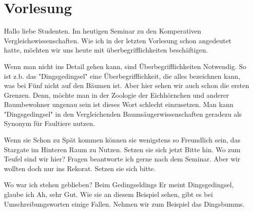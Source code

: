 
\newpage
\section{Vorlesung}
\label{sec:vorlesung}
    \charaktere{\Sum, \Gimli, \Prof, \Studa, \Studb, \Studc}

\begin{verseplay}[3em]
\s{\Prof} Hallo liebe Studenten. Im heutigen Seminar zu den Komperativen Vergleichswissenschaften. Wie ich in der letzten Vorlesung schon angedeutet hatte, möchten wir uns heute mit überbegrifflichkeiten beschäftigen.
\end{verseplay}

\begin{verseplay}[3em]
 \s{\Prof} Wenn man nicht ins Detail gehen kann, sind Überbegrifflichkeiten Notwendig. So ist z.b. das "Dingsgedingsel" eine Überbegrifflichkeit, die alles bezeichnen kann, was bei Fünf nicht auf den Bäumen ist. Aber hier sehen wir auch schon die ersten Grenzen. Denn, möchte man in der Zoologie der Eichhörnchen und anderer Baumbewohner ungenau sein ist dieses Wort schlecht einzusetzen. Man kann "Dingsgedingsel" in den Vergleichenden Baumsäugerwissenschaften geradezu als Synonym für Faultiere nutzen.
\end{verseplay}
\begin{verseplay}[3em]
\s\Prof Wenn sie Schon zu Spät kommen können sie wenigstens so Freundlich sein, das Stargate im Hinteren Raum zu Nutzen. Setzen sie sich jetzt Bitte hin.
\s\Gimli {} Wo zum Teufel sind wir hier?
\s\Prof Fragen beantworte ich gerne nach dem Seminar.
\s\Gimli Aber wir wollten doch nur  ins Rekorat.
\s\Prof {} Setzen sie sich bitte.
\end{verseplay}

\begin{verseplay}[3em]
\s\Prof Wo war ich stehen geblieben?
\s\Studa Beim Gedingseldings
\s\Studb Er meint Dingsgedingsel, glaube ich
\s\Prof Ah, sehr Gut. Wie sie an diesem Beispiel sehen, gibt es bei Umschreibungsworten einige Fallen. Nehmen wir zum Beispiel das Dingsbumms.
\end{verseplay}


